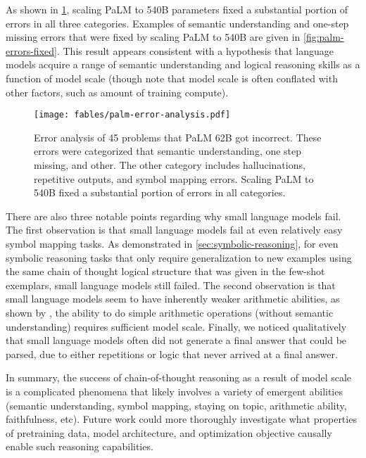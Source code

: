 \documentclass[]{article}
\theoremstyle{plain}
\theoremstyle{definition}
\theoremstyle{remark}
\newcommand{\palm}[0]{PaLM}
\begin{document}
As shown in \cref{fig:palm-error-analysis}, scaling \palm{} to 540B parameters fixed a substantial portion of errors in all three categories.
Examples of semantic understanding and one-step missing errors that were fixed by scaling \palm{} to 540B are given in \cref{fig:palm-errors-fixed}.
This result appears consistent with a hypothesis that language models acquire a range of semantic understanding and logical reasoning skills as a function of model scale (though note that model scale is often conflated with other factors, such as amount of training compute). 

\begin{figure}[H]
\centering
\texttt{[image: fables/palm-error-analysis.pdf]}
\caption{
Error analysis of 45 problems that \palm{} 62B got incorrect.
These errors were categorized that semantic understanding, one step missing, and other. The other category includes hallucinations, repetitive outputs, and symbol mapping errors.
Scaling \palm{} to 540B fixed a substantial portion of errors in all categories.
}
\label{fig:palm-error-analysis}
\end{figure} 

There are also three notable points regarding why small language models fail.
The first observation is that small language models fail at even relatively easy symbol mapping tasks. 
As demonstrated in \cref{sec:symbolic-reasoning}, for even symbolic reasoning tasks that only require generalization to new examples using the same chain of thought logical structure that was given in the few-shot exemplars, small language models still failed.
The second observation is that small language models seem to have inherently weaker arithmetic abilities, as shown by \cite{brown2020language}, the ability to do simple arithmetic operations (without semantic understanding) requires sufficient model scale.
Finally, we noticed qualitatively that small language models often did not generate a final answer that could be parsed, due to either repetitions or logic that never arrived at a final answer.

In summary, the success of chain-of-thought reasoning as a result of model scale is a complicated phenomena that likely involves a variety of emergent abilities (semantic understanding, symbol mapping, staying on topic, arithmetic ability, faithfulness, etc).
Future work could more thoroughly investigate what properties of pretraining data, model architecture, and optimization objective causally enable such reasoning capabilities.
\end{document}
